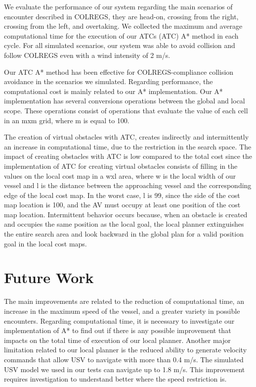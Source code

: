     We evaluate the performance of our system regarding the main scenarios of encounter described in \ac{COLREGS}, they are head-on, crossing from the right, crossing from the left, and overtaking. We collected the maximum and average computational time for the execution of our \aclp{ATC} (\ac{ATC}) A* method in each cycle. For all simulated scenarios, our system was able to avoid collision and follow \ac{COLREGS} even with a wind intensity of 2 m/s.

    Our \ac{ATC} A* method has been effective for \ac{COLREGS}-compliance collision avoidance in the scenarios we simulated. Regarding performance, the computational cost is mainly related to our A* implementation. Our A* implementation has several conversions operations between the global and local scope. These operations consist of operations that evaluate the value of each cell in an mxm grid, where m is equal to 100.

    The creation of virtual obstacles with \ac{ATC}, creates indirectly and intermittently an increase in computational time, due to the restriction in the search space. The impact of creating obstacles with \ac{ATC} is low compared to the total cost since the implementation of \ac{ATC} for creating virtual obstacles consists of filling in the values on the local cost map in a wxl area, where w is the local width of our vessel and l  is the distance between the approaching vessel and the corresponding edge of the local cost map. In the worst case, l is 99, since the side of the cost map location is 100, and the \ac{AV} must occupy at least one position of the cost map location. Intermittent behavior occurs because, when an obstacle is created and occupies the same position as the local goal, the local planner extinguishes the entire search area and look backward in the global plan for a valid position goal in the local cost maps.
    
    \section{Future Work}
    
    The main improvements are related to the reduction of computational time, an increase in the maximum speed of the vessel, and a greater variety in possible encounters. Regarding computational time, it is necessary to investigate our implementation of A* to find out if there is any possible improvement that impacts on the total time of execution of our local planner. Another major limitation related to our local planner is the reduced ability to generate velocity commands that allow \ac{USV} to navigate with more than 0.4 m/s. The simulated \ac{USV} model we used in our tests can navigate up to 1.8 m/s. This improvement requires investigation to understand better where the speed restriction is.
    
